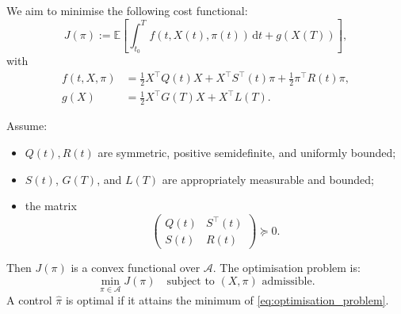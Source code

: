 We aim to minimise the following cost functional:
\begin{equation}
\label{eq:cost_functional}
J(\pi) := \mathbb{E} \left[ \int_{t_0}^T f(t, X(t), \pi(t)) \, \mathrm{d}t + g(X(T)) \right],
\end{equation}
with
\begin{align}
    f(t, X, \pi) &= \tfrac{1}{2} X^\top Q(t) X + X^\top S^\top(t) \pi + \tfrac{1}{2} \pi^\top R(t) \pi, \label{eq:running_cost} \\
    g(X) &= \tfrac{1}{2} X^\top G(T) X + X^\top L(T). \label{eq:terminal_cost}
\end{align}

Assume:
\begin{itemize}
    \item $Q(t), R(t)$ are symmetric, positive semidefinite, and uniformly bounded;
    \item $S(t)$, $G(T)$, and $L(T)$ are appropriately measurable and bounded;
    \item the matrix
    \[
        \begin{pmatrix}
            Q(t) & S^\top(t) \\
            S(t) & R(t)
        \end{pmatrix}
        \succeq 0.
    \]
\end{itemize}

Then $J(\pi)$ is a convex functional over $\mathcal{A}$. The optimisation problem is:
\begin{equation}
    \min_{\pi \in \mathcal{A}} J(\pi) \quad \text{subject to } (X, \pi) \text{ admissible}.
    \label{eq:optimisation_problem}
\end{equation}
A control $\hat{\pi}$ is optimal if it attains the minimum of \eqref{eq:optimisation_problem}.

